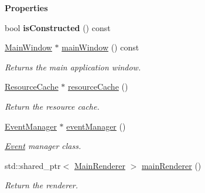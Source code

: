 \begin{Indent}\textbf{ Properties}\par
\begin{DoxyCompactItemize}
\item 
\mbox{\label{classrev_1_1_core_engine_a108bc2871fc4868ee7153d6ed3eacc08}} 
bool {\bfseries is\+Constructed} () const
\item 
\mbox{\label{classrev_1_1_core_engine_a85af90d9ccdd477eaffe5ad9f0b6ed2f}} 
\mbox{\hyperlink{classrev_1_1_main_window}{Main\+Window}} $\ast$ \mbox{\hyperlink{classrev_1_1_core_engine_a85af90d9ccdd477eaffe5ad9f0b6ed2f}{main\+Window}} () const
\begin{DoxyCompactList}\small\item\em Returns the main application window. \end{DoxyCompactList}\item 
\mbox{\label{classrev_1_1_core_engine_a7ee4e0ea2013f13ab8686b9ffce9ef8d}} 
\mbox{\hyperlink{classrev_1_1_resource_cache}{Resource\+Cache}} $\ast$ \mbox{\hyperlink{classrev_1_1_core_engine_a7ee4e0ea2013f13ab8686b9ffce9ef8d}{resource\+Cache}} ()
\begin{DoxyCompactList}\small\item\em Return the resource cache. \end{DoxyCompactList}\item 
\mbox{\label{classrev_1_1_core_engine_a947684bd82d6529dfe9015e697e059c6}} 
\mbox{\hyperlink{classrev_1_1_event_manager}{Event\+Manager}} $\ast$ \mbox{\hyperlink{classrev_1_1_core_engine_a947684bd82d6529dfe9015e697e059c6}{event\+Manager}} ()
\begin{DoxyCompactList}\small\item\em \mbox{\hyperlink{classrev_1_1_event}{Event}} manager class. \end{DoxyCompactList}\item 
\mbox{\label{classrev_1_1_core_engine_a698a11e23a298daa1dc14b3a783644dd}} 
std\+::shared\+\_\+ptr$<$ \mbox{\hyperlink{classrev_1_1_main_renderer}{Main\+Renderer}} $>$ \mbox{\hyperlink{classrev_1_1_core_engine_a698a11e23a298daa1dc14b3a783644dd}{main\+Renderer}} ()
\begin{DoxyCompactList}\small\item\em Return the renderer. \end{DoxyCompactList}\item 

\end{DoxyCompactItemize}
\end{Indent}
